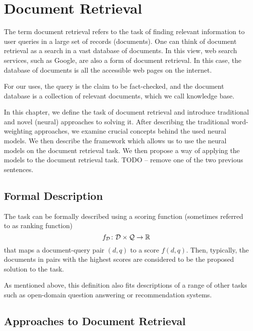 \chapter{Document Retrieval}
\label{chap:docret}

The term document retrieval refers to the task of finding relevant information to user queries in a large set of records (documents). 
One can think of document retrieval as a search in a vast database of documents. 
In this view, web search services, such as Google, are also a form of document retrieval. 
In this case, the database of documents is all the accessible web pages on the internet.

For our uses, the query is the claim to be fact-checked, and the document database is a collection of relevant documents, which we call knowledge base. 

In this chapter, we define the task of document retrieval and introduce traditional and novel (neural) approaches to solving it.
After describing the traditional word-weighting approaches, we examine crucial concepts behind the used neural models.
We then describe the framework which allows us to use the neural models on the document retrieval task.
We then propose a way of applying the models to the document retrieval task.
TODO -- remove one of the two previous sentences.

\section{Formal Description}
\label{sec:formal_descr_dr}
The task can be formally described \citep{two-tower} using a scoring function (sometimes referred to as ranking function) %
\begin{equation}
        f_\mathcal{D}\colon\mathcal{D}\times\mathcal{Q}\rightarrow\mathbb{R}
        \label{eq:formal_descr_dr}
\end{equation}
that maps a document-query pair $(d, q)$ to a score $f(d,q)$. 
Then, typically, the documents in pairs with the highest scores are considered to be the proposed solution to the task. 

As mentioned above, this definition also fits descriptions of a range of other tasks such as open-domain question answering \citep{wiki-retrieval} or recommendation systems.

\section{Approaches to Document Retrieval}

